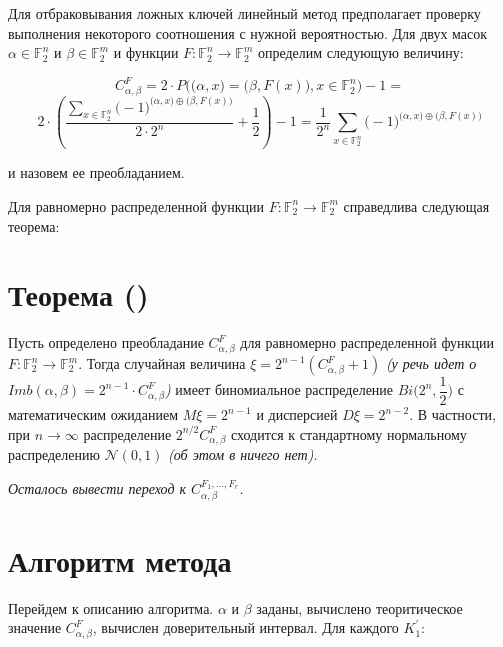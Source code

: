 \documentclass[utf8x, 14pt]{G7-32} %
\begin{document}
Для отбраковывания ложных ключей линейный метод предполагает проверку выполнения некоторого соотношения с нужной вероятностью. Для двух масок $\alpha \in \mathbb{F}_2^n$ и $\beta \in \mathbb{F}_2^m$ и функции $F :\mathbb{F}_2^n \to \mathbb{F}_2^m$ определим следующую величину:

$$ C_{\alpha, \beta}^{F} = 2\cdot P\Big( \big(\alpha, x\big) = \big(\beta, F(x)\big), x\in \mathbb{F}_2^n\Big) - 1 = $$
$$ 2\cdot \left(\dfrac{\sum_{x\in \mathbb{F}_2^n} \big(-1\big)^{\big(\alpha, x\big) \oplus \big(\beta, F(x)\big)}}{2 \cdot 2^n} + \dfrac{1}{2}\right)  - 1 = \dfrac{1}{2^n} \sum_{x\in \mathbb{F}_2^n} \big(-1\big)^{\big(\alpha, x\big) \oplus \big(\beta, F(x)\big)}$$

и назовем ее преобладанием.

Для равномерно распределенной функции $F :\mathbb{F}_2^n \to \mathbb{F}_2^m$ справедлива следующая теорема:
\section{Теорема (\cite{Daemen})}\label{theorem}

 Пусть определено преобладание $C_{\alpha, \beta}^{F}$ для равномерно распределенной функции $F: \mathbb{F}_2^n \to \mathbb{F}_2^m$. Тогда случайная величина $\xi = 2^{n-1}(C_{\alpha, \beta}^{F}+1)$ \textit{(у \cite{Daemen} речь идет о $Imb(\alpha, \beta) = 2^{n-1}\cdot C_{\alpha, \beta}^{F}$)}  имеет биномиальное распределение $Bi\big(2^n, \dfrac{1}{2}\big)$ с математическим ожиданием $M\xi = 2^{n-1}$ и дисперсией $D\xi = 2^{n-2}$. В частности, при $n\to\infty$ распределение $2^{n/2}C_{\alpha, \beta}^{F}$ сходится к стандартному нормальному распределению $\mathcal{N}(0,1)$ \textit{(об этом в \cite{Daemen} ничего нет)}.

\textit{Осталось вывести переход к $C_{\alpha, \beta}^{F_1, ..., F_r}$. }

\section{Алгоритм метода}
Перейдем к описанию алгоритма. $\alpha$ и $\beta$ заданы, вычислено теоритическое значение $C_{\alpha, \beta}^F$, вычислен доверительный интервал. Для каждого $K_1^{'}$:
\end{document}
